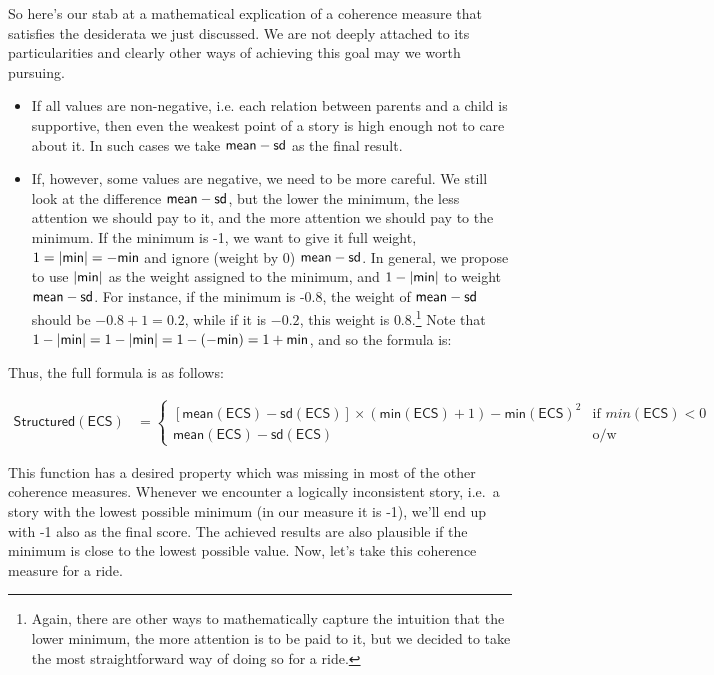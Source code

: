 \documentclass[10pt,]{scrartcl}
\newcommand{\s}[1]{\mbox{\textsf{#1}}}
\begin{document}
So here's our stab at a mathematical explication of a coherence measure
that satisfies the desiderata we just discussed. We are not deeply
attached to its particularities and clearly other ways of achieving this
goal may we worth pursuing.

\begin{itemize}
\item  If all values are non-negative, i.e. each relation between parents and a child is supportive, then even the weakest point of a story is high enough not to care about it. In such cases we take $\s{mean} - \s{sd}$ as the final result.

\item If, however, some values are negative, we need to be more careful. We still look at the difference $\s{mean} - \s{sd}$, but  the lower the minimum, the less attention we should pay to it, and the more attention we should pay to the minimum. If the minimum is -1, we want to give it full weight, $1 = \vert \s{min}\vert = - \s{min}$ and ignore (weight by 0) $\s{mean} - \s{sd}$. In general, we propose to use $\vert \s{min}\vert$  as the weight assigned to the minimum, and  $1-\vert \s{min}\vert$  to weight $\s{mean} - \s{sd}$.  For instance, if the minimum is -0.8, the weight of  $\s{mean} - \s{sd}$ should be $-0.8+1 = 0.2$, while if it is $-0.2$, this weight is $0.8$.\footnote{Again, there are other ways to mathematically capture the intuition that the lower minimum, the more attention is to be paid to it, but we decided to take the most straightforward way of doing so for a ride.}  Note that  $1-\vert \s{min}\vert =  1-\vert \s{min}\vert = 1 - (- \s{min}) = 1+\s{min}$, and so the  formula is:
\end{itemize}

Thus, the full formula is as follows:

\footnotesize

\begin{align*}
\mathsf{Structured}(\mathsf{ECS}) & = \begin{cases}
\left[\mathsf{mean}(\mathsf{ECS}) - \textsf{sd}(\mathsf{ECS})\right] \times \left(\textsf{min}(\mathsf{ECS})+1 \right) - \textsf{min}(\mathsf{ECS})^2   & \text{if } min(\mathsf{ECS})<0 \\\mathsf{mean}(\mathsf{ECS}) - \textsf{sd}(\mathsf{ECS}) & \text{o/w}
\end{cases}
\end{align*}

\normalsize

This function has a desired property which was missing in most of the
other coherence measures. Whenever we encounter a logically inconsistent
story, i.e.~a story with the lowest possible minimum (in our measure it
is -1), we'll end up with -1 also as the final score. The achieved
results are also plausible if the minimum is close to the lowest
possible value. Now, let's take this coherence measure for a ride.
\end{document}
